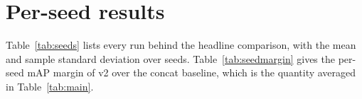 \section{Per-seed results}
\label{app:seeds}
Table~\ref{tab:seeds} lists every run behind the headline comparison, with the mean and sample standard deviation over seeds. Table~\ref{tab:seedmargin} gives the per-seed mAP margin of v2 over the concat baseline, which is the quantity averaged in Table~\ref{tab:main}.

\begin{table}[t]
\centering
\caption{Per-seed accuracy in percent, 80 epochs. The last three columns are COCO size bands.}
\label{tab:seeds}
{\footnotesize\setlength{\tabcolsep}{4.5pt}
}
\end{table}
